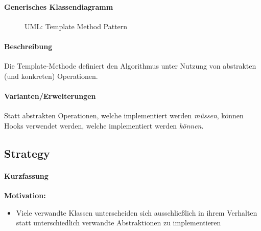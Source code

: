 \documentclass[a4paper, 11pt, accentcolor = tud3b]{tudreport}
\begin{document}
				\paragraph{Generisches Klassendiagramm}
					\begin{figure}[ht]
						\centering
						\caption{UML: Template Method Pattern}
					\end{figure}
				
				\paragraph{Beschreibung}
					Die Template-Methode definiert den Algorithmus unter Nutzung von abstrakten (und konkreten) Operationen.
					
				\paragraph{Varianten/Erweiterungen}
					Statt abstrakten Operationen, welche implementiert werden \textit{müssen}, können Hooks verwendet werden, welche implementiert werden \textit{können}.
			
			\subsection{Strategy}
				\paragraph{Kurzfassung}
					\textbf{Motivation:}
						\begin{itemize}
							\item Viele verwandte Klassen unterscheiden sich ausschließlich in ihrem Verhalten statt unterschiedlich verwandte Abstraktionen zu implementieren
						\end{itemize}
				
\end{document}

